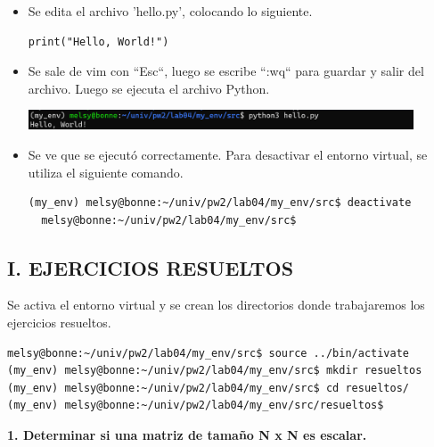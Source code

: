 \documentclass{article}
\begin{document}
\begin{itemize}
  \item Se edita el archivo 'hello.py', colocando lo siguiente.

  \begin{lstlisting}[style=python]
  print("Hello, World!")
  \end{lstlisting}
  
  \item Se sale de vim con ``Esc``, luego se escribe ``:wq`` para guardar y salir del archivo. Luego se ejecuta el archivo Python.

  \begin{minipage}{\linewidth}
    \centering
    \includegraphics[width=0.9\textwidth]{imagenes/hello.png}
  \end{minipage}

  
  \item Se ve que se ejecutó correctamente. Para desactivar el entorno virtual, se utiliza el siguiente comando.

  \begin{lstlisting}[style=shell]
  (my_env) melsy@bonne:~/univ/pw2/lab04/my_env/src$ deactivate
  melsy@bonne:~/univ/pw2/lab04/my_env/src$
  \end{lstlisting}
\end{itemize}

\pagebreak

\subsection*{I. EJERCICIOS RESUELTOS}

\vspace{\baselineskip}

Se activa el entorno virtual y se crean los directorios donde trabajaremos los ejercicios resueltos.

\begin{lstlisting}[style=shell]
melsy@bonne:~/univ/pw2/lab04/my_env/src$ source ../bin/activate
(my_env) melsy@bonne:~/univ/pw2/lab04/my_env/src$ mkdir resueltos
(my_env) melsy@bonne:~/univ/pw2/lab04/my_env/src$ cd resueltos/
(my_env) melsy@bonne:~/univ/pw2/lab04/my_env/src/resueltos$
\end{lstlisting} 

\vspace{2\baselineskip}

\textbf{1. Determinar si una matriz de tamaño N x N es escalar.}
\end{document}
